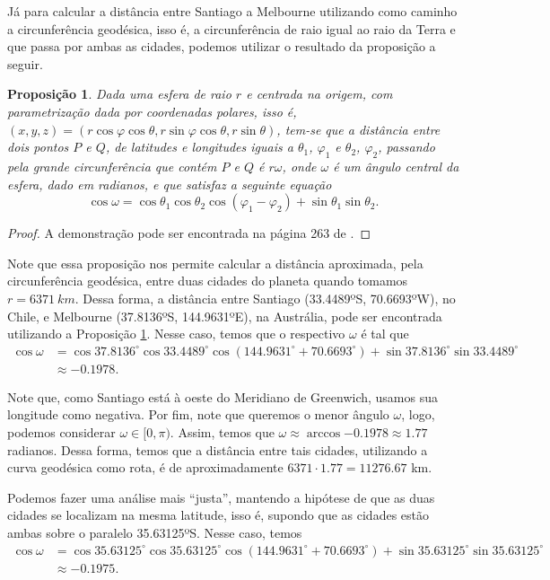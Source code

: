 \documentclass{article}
\newtheorem{proposition}{Proposição}
\begin{document}
Já para calcular a distância entre Santiago a Melbourne utilizando como caminho a circunferência geodésica, isso é, a circunferência de raio igual ao raio da Terra e que passa por ambas as cidades, podemos utilizar o resultado da proposição a seguir.
\begin{proposition}
    \label{prop6}
    Dada uma esfera de raio $r$ e centrada na origem, com parametrização dada por coordenadas polares, isso é, $(x, y, z) = (r\cos{\varphi}\cos{\theta}, r\sin{\varphi}\cos{\theta}, r\sin{\theta})$, tem-se que a distância entre dois pontos $P$ e $Q$, de latitudes e longitudes iguais a $\theta_1$, $\varphi_1$ e $\theta_2$, $\varphi_2$, passando pela grande circunferência que contém $P$ e $Q$ é $r\omega$, onde $\omega$ é um ângulo central da esfera, dado em radianos, e que satisfaz a seguinte equação
    \[\cos{\omega} = \cos{\theta_1}\cos{\theta_2}\cos{\left(\varphi_1 - \varphi_2\right)} + \sin{\theta_1}\sin{\theta_2}.\]
\end{proposition}
\begin{proof}
    A demonstração pode ser encontrada na página 263 de \cite{fenn}.
\end{proof}

Note que essa proposição nos permite calcular a distância aproximada, pela circunferência geodésica, entre duas cidades do planeta quando tomamos $r = 6371~km$. Dessa forma, a distância entre Santiago (33.4489ºS, 70.6693ºW), no Chile, e Melbourne (37.8136ºS, 144.9631ºE), na Austrália, pode ser encontrada utilizando a Proposição \ref{prop6}. Nesse caso, temos que o respectivo $\omega$ é tal que
\begin{align*}
    \cos{\omega} & = \cos{37.8136^\circ}\cos{33.4489^\circ}\cos{\left(144.9631^\circ + 70.6693^\circ\right)} + \sin{37.8136^\circ}\sin{33.4489^\circ} \\
    & \approx -0.1978.
\end{align*}

Note que, como Santiago está à oeste do Meridiano de Greenwich, usamos sua longitude como negativa. Por fim, note que queremos o menor ângulo $\omega$, logo, podemos considerar $\omega\in [0, \pi)$. Assim, temos que $\omega\approx \arccos{-0.1978}\approx 1.77$ radianos. Dessa forma, temos que a distância entre tais cidades, utilizando a curva geodésica como rota, é de aproximadamente $6371\cdot 1.77 = 11276.67$ km.

Podemos fazer uma análise mais ``justa'', mantendo a hipótese de que as duas cidades se localizam na mesma latitude, isso é, supondo que as cidades estão ambas sobre o paralelo 35.63125ºS. Nesse caso, temos
\begin{align*}
    \cos{\omega} & = \cos{35.63125^\circ}\cos{35.63125^\circ}\cos{\left(144.9631^\circ + 70.6693^\circ\right)} + \sin{35.63125^\circ}\sin{35.63125^\circ} \\
    & \approx -0.1975.
\end{align*}
\end{document}

